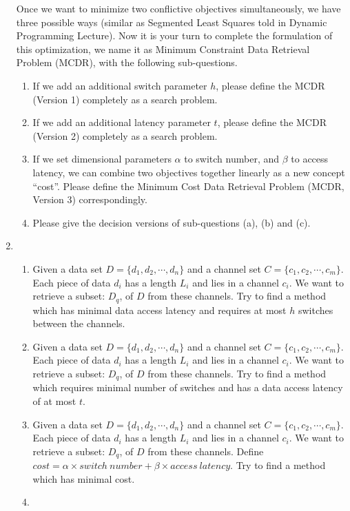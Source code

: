 \documentclass[12pt,a4paper]{article}
\makeatletter
\newtheorem*{solution}{Solution}
\theoremstyle{definition}
\renewenvironment{solution}[1][Solution] {\par\pushQED{\qed}\normalfont\topsep6\p@\@plus6\p@\relax\trivlist\item[\hskip\labelsep\bfseries#1\@addpunct{.}]\ignorespaces}{\popQED\endtrivlist\@endpefalse} \makeatother
\makeatother
\begin{document}
\begin{enumerate}
Once we want to minimize two conflictive objectives simultaneously, we have three possible ways (similar as Segmented Least Squares told in Dynamic Programming Lecture). Now it is your turn to complete the formulation of this optimization, we name it as Minimum Constraint Data Retrieval Problem (MCDR), with the following sub-questions.
\begin{enumerate}
	\item If we add an additional switch parameter $h$, please define the MCDR (Version 1) completely as a search problem.
	\item If we add an additional latency parameter $t$, please define the MCDR (Version 2) completely as a search problem.
	\item If we set dimensional parameters $\alpha$ to switch number, and $\beta$ to access latency, we can combine two objectives together linearly as a new concept ``cost''. Please define the Minimum Cost Data Retrieval Problem (MCDR, Version 3) correspondingly.
	\item Please give the decision versions of sub-questions (a), (b) and (c).
\end{enumerate}
\begin{solution}
	\begin{enumerate}
		\item 
		    Given a data set $D=\{d_1,d_2,\cdots,d_n\}$ and a channel set $C=\{c_1,c_2,\cdots,c_m\}$. Each piece of data $d_i$ has a length $L_i$ and lies in a channel $c_i$. We want to retrieve a subset: $D_q$, of $D$ from these channels. Try to find a method which has minimal data access latency and requires at most $h$ switches between the channels.
		\item 
		    Given a data set $D=\{d_1,d_2,\cdots,d_n\}$ and a channel set $C=\{c_1,c_2,\cdots,c_m\}$. Each piece of data $d_i$ has a length $L_i$ and lies in a channel $c_i$. We want to retrieve a subset: $D_q$, of $D$ from these channels. Try to find a method which requires minimal number of switches and has a data access latency of at most $t$.
		\item 
		    Given a data set $D=\{d_1,d_2,\cdots,d_n\}$ and a channel set $C=\{c_1,c_2,\cdots,c_m\}$. Each piece of data $d_i$ has a length $L_i$ and lies in a channel $c_i$. We want to retrieve a subset: $D_q$, of $D$ from these channels. Define $cost=\alpha\times switch\ number+\beta\times access\ latency$. Try to find a method which has minimal cost.
		\item 
		\ \\
		    \begin{itemize}

\end{itemize}
\end{enumerate}
\end{solution}
\end{enumerate}
\end{document}
